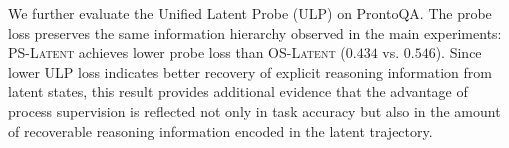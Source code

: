 We further evaluate the Unified Latent Probe (ULP) on ProntoQA.
The probe loss preserves the same information hierarchy observed in the main experiments: \textsc{PS-Latent} achieves lower probe loss than \textsc{OS-Latent} ($0.434$ vs. $0.546$).
Since lower ULP loss indicates better recovery of explicit reasoning information from latent states, this result provides additional evidence that the advantage of process supervision is reflected not only in task accuracy but also in the amount of recoverable reasoning information encoded in the latent trajectory.